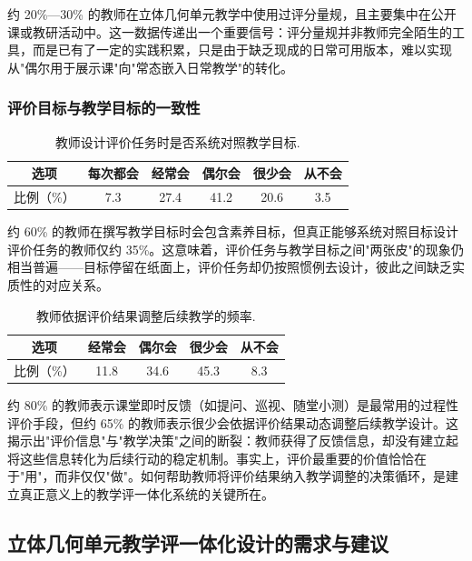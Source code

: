 \documentclass[UTF8,a4paper,12pt,twoside]{ctexart}
\begin{document}
约 20\%—30\% 的教师在立体几何单元教学中使用过评分量规，且主要集中在公开课或教研活动中。这一数据传递出一个重要信号：评分量规并非教师完全陌生的工具，而是已有了一定的实践积累，只是由于缺乏现成的日常可用版本，难以实现从"偶尔用于展示课"向"常态嵌入日常教学"的转化。

\subsubsection{评价目标与教学目标的一致性}

\begin{center}
\begin{table}[H]
\begin{tabular}{|c|c|c|c|c|c|}
\hline
选项 & 每次都会 & 经常会 & 偶尔会 & 很少会 & 从不会 \\
\hline
比例（\%） & 7.3 & 27.4 & 41.2 & 20.6 & 3.5 \\
\hline
\end{tabular}
\caption{\label{tab3.17}教师设计评价任务时是否系统对照教学目标.}
\end{table}
\end{center}

约 60\% 的教师在撰写教学目标时会包含素养目标，但真正能够系统对照目标设计评价任务的教师仅约 35\%。这意味着，评价任务与教学目标之间"两张皮"的现象仍相当普遍——目标停留在纸面上，评价任务却仍按照惯例去设计，彼此之间缺乏实质性的对应关系。

\begin{center}
\begin{table}[H]
\begin{tabular}{|c|c|c|c|c|}
\hline
选项 & 经常会 & 偶尔会 & 很少会 & 从不会 \\
\hline
比例（\%） & 11.8 & 34.6 & 45.3 & 8.3 \\
\hline
\end{tabular}
\caption{\label{tab3.18}教师依据评价结果调整后续教学的频率.}
\end{table}
\end{center}

约 80\% 的教师表示课堂即时反馈（如提问、巡视、随堂小测）是最常用的过程性评价手段，但约 65\% 的教师表示很少会依据评价结果动态调整后续教学设计。这揭示出"评价信息"与"教学决策"之间的断裂：教师获得了反馈信息，却没有建立起将这些信息转化为后续行动的稳定机制。事实上，评价最重要的价值恰恰在于"用"，而非仅仅"做"。如何帮助教师将评价结果纳入教学调整的决策循环，是建立真正意义上的教学评一体化系统的关键所在。

\subsection{立体几何单元教学评一体化设计的需求与建议}
\end{document}
